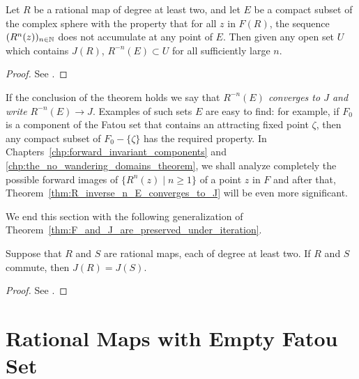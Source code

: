 \begin{theorem}
    \label{thm:R_inverse_n_E_converges_to_J}
    Let $R$ be a rational map of degree at least two, and let $E$ be a compact
    subset of the complex sphere with the property that for all $z$ in $F(R)$,
    the sequence $(R^n(z))_{n \in \mathbb{N}}$ does not accumulate at any point of $E$.
    Then given any open set $U$ which contains $J(R)$, $R^{-n}(E) \subset U$ for
    all sufficiently large $n$.
\end{theorem}
\begin{proof}
    See \cite[72]{Beardon1991}.
\end{proof}

\begin{remark}[Notation $R^{-n}(E) \to J$]
    If the conclusion of the theorem holds we say that \emph{$R^{-n}(E)$
    converges to $J$ and write $R^{-n}(E) \to J$}. Examples of such sets $E$ are
    easy to find: for example, if $F_0$ is a component of the Fatou set that
    contains an attracting fixed point $\zeta$, then any compact subset of $F_0
    - \{\zeta\}$ has the required property. In
    Chapters~\ref{chp:forward_invariant_components} and
    \ref{chp:the_no_wandering_domains_theorem}, we shall analyze completely the
    possible forward images of $\{R^n(z) \mid n \geq 1\}$ of a point $z$ in $F$
    and after that, Theorem~\ref{thm:R_inverse_n_E_converges_to_J} will be even
    more significant.
\end{remark}

We end this section with the following generalization of
Theorem~\ref{thm:F_and_J_are_preserved_under_iteration}.

\begin{theorem}
    Suppose that $R$ and $S$ are rational maps, each of degree at least two. If
    $R$ and $S$ commute, then $J(R) = J(S)$.
\end{theorem}
\begin{proof}
    See \cite[72--73]{Beardon1991}.
\end{proof}

\section{Rational Maps with Empty Fatou Set}
\label{sec:rational_maps_with_empty_Fatou_set}

